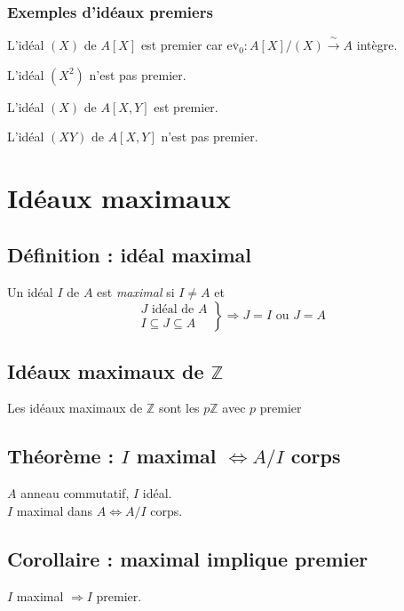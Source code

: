 \documentclass[reqno,a4paper,10pt]{report}
\makeatletter
\newcommand{\IZ}{\ensuremath{\mathbb{Z}}\xspace} %
\newcommand{\soo}{\Longrightarrow}
\newcommand{\bij}{\overset{\!\sim}{\to}} %
\newcommand{\pfootnote}[1]{\up{(}\footnote{#1}\up{)}} %
\newcommand{\ioi}{\Leftrightarrow} %
\newcommand{\ev}[1]{\mathrm{ev}_{ #1 }}
\let\olditemize=\itemize%
\renewenvironment{itemize}{%
    \olditemize%
  }{%
    \@noparlisttrue%
    \endlist%
  }%
\makeatother
\begin{document}
\subsubsection{Exemples d'idéaux premiers}
\begin{itemize}
  \item L'idéal $(X)$ de $A[X]$ est premier car $\overline{\ev 0} : A[X]/(X)
    \bij A$ intègre.
  \item L'idéal $(X^2)$ n'est pas premier.
  \item L'idéal $(X)$ de $A[X,Y]$ est premier.
  \item L'idéal $(XY)$ de $A[X,Y]$ n'est pas premier.
\end{itemize}

\section{Idéaux maximaux}
\subsection{Définition : idéal maximal}
Un idéal $I$ de $A$ est \emph{maximal} si $I\neq A$ et
\[\left.
\begin{array}{r}
  J \text{ idéal de } A\\
  I \subseteq J \subseteq A
\end{array}\right\} \soo J=I \text{ ou } J=A\]

\subsection{Idéaux maximaux de $\IZ$}
Les idéaux maximaux de $\IZ$ sont les $p\IZ$ avec $p$ premier
\begin{comment}
  \pfootnote{Preuve 04/11/09 p3}
\end{comment}

\subsection{Théorème : $I$ maximal $\ioi A/I$ corps}
$A$ anneau commutatif, $I$ idéal.\\
$I$ maximal dans $A \iff A/I$ corps.

\begin{comment}
  Preuve 05/11/09 p1
\end{comment}

\subsection{Corollaire : maximal implique premier}
$I$ maximal $\soo I$ premier.
\end{document}
